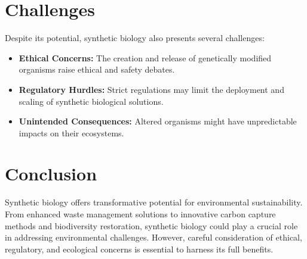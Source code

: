 \documentclass{article}
\begin{document}
\section{Challenges}
Despite its potential, synthetic biology also presents several challenges:

\begin{itemize}
    \item \textbf{Ethical Concerns:} The creation and release of genetically modified organisms raise ethical and safety debates.
    \item \textbf{Regulatory Hurdles:} Strict regulations may limit the deployment and scaling of synthetic biological solutions.
    \item \textbf{Unintended Consequences:} Altered organisms might have unpredictable impacts on their ecosystems.
\end{itemize}

\section{Conclusion}
Synthetic biology offers transformative potential for environmental sustainability. From enhanced waste management solutions to innovative carbon capture methods and biodiversity restoration, synthetic biology could play a crucial role in addressing environmental challenges. However, careful consideration of ethical, regulatory, and ecological concerns is essential to harness its full benefits.



\end{document}
